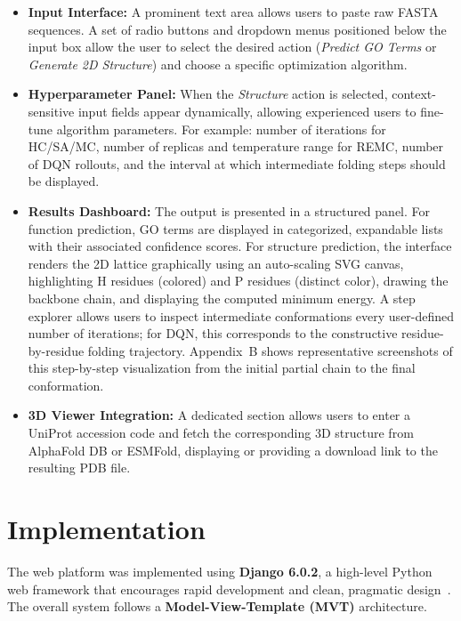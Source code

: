 \begin{itemize}
    \item \textbf{Input Interface:} A prominent text area allows users to paste raw FASTA sequences. A set of radio buttons and dropdown menus positioned below the input box allow the user to select the desired action (\textit{Predict GO Terms} or \textit{Generate 2D Structure}) and choose a specific optimization algorithm.

    \item \textbf{Hyperparameter Panel:} When the \textit{Structure} action is selected, context-sensitive input fields appear dynamically, allowing experienced users to fine-tune algorithm parameters. For example: number of iterations for HC/SA/MC, number of replicas and temperature range for REMC, number of DQN rollouts, and the interval at which intermediate folding steps should be displayed.

    \item \textbf{Results Dashboard:} The output is presented in a structured panel. For function prediction, GO terms are displayed in categorized, expandable lists with their associated confidence scores. For structure prediction, the interface renders the 2D lattice graphically using an auto-scaling SVG canvas, highlighting H residues (colored) and P residues (distinct color), drawing the backbone chain, and displaying the computed minimum energy. A step explorer allows users to inspect intermediate conformations every user-defined number of iterations; for DQN, this corresponds to the constructive residue-by-residue folding trajectory. Appendix~B shows representative screenshots of this step-by-step visualization from the initial partial chain to the final conformation.

    \item \textbf{3D Viewer Integration:} A dedicated section allows users to enter a UniProt accession code and fetch the corresponding 3D structure from AlphaFold DB or ESMFold, displaying or providing a download link to the resulting PDB file.
\end{itemize}

\section{Implementation}
\label{cap3:sec_implementation}

The web platform was implemented using \textbf{Django 6.0.2}, a high-level Python web framework that encourages rapid development and clean, pragmatic design~\cite{django2024}. The overall system follows a \textbf{Model-View-Template (MVT)} architecture.

